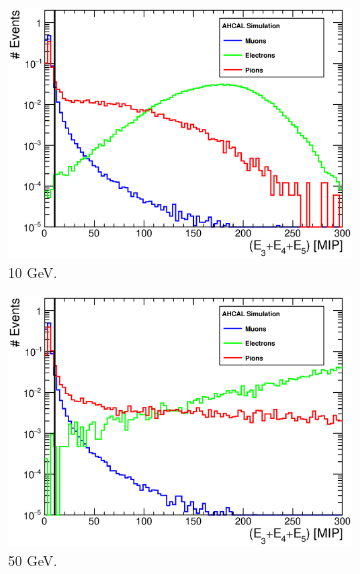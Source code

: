 \begin{figure}[htbp!]
	\begin{subfigure}[t]{0.49\textwidth}
		\centering
		\includegraphics[width=1\linewidth]{../Thesis_Plots/Timing/Electrons/Plots/SelectionCut_EnergyE3_10GeV.eps}
		\caption{10 GeV.} \label{fig:e10GeV_E3}
	\end{subfigure}
	\hfill
	\begin{subfigure}[t]{0.49\textwidth}
		\centering
		\includegraphics[width=1\linewidth]{../Thesis_Plots/Timing/Electrons/Plots/SelectionCut_EnergyE3_50GeV.eps}
		\caption{50 GeV.} \label{fig:e50GeV_E3}
	\end{subfigure}
	\hfill
	\begin{subfigure}[t]{0.5\textwidth}
		\centering

\end{subfigure}
\end{figure}
